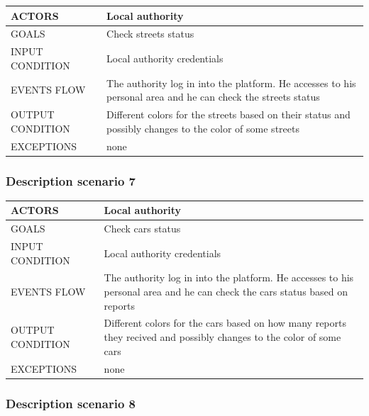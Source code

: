 \begin{center}
	\begin{tabular}{ | l | p{6cm} | } 
		\hline
		ACTORS & Local authority  \\ 
		\hline
		GOALS & Check streets status  \\ 
		\hline
		INPUT CONDITION & Local authority credentials  \\ 
		\hline
		EVENTS FLOW & The authority log in into the platform. He accesses to his personal area and he can check the streets status \\ 
		\hline
		OUTPUT CONDITION & Different colors for the streets based on their status and possibly changes to the color of some streets \\ 
		\hline
		EXCEPTIONS & none \\ 
		\hline
	\end{tabular}
\end{center}

\subsubsection{Description scenario 7}

\begin{center}
	\begin{tabular}{ | l | p{6cm} | } 
		\hline
		ACTORS & Local authority  \\ 
		\hline
		GOALS & Check cars status  \\ 
		\hline
		INPUT CONDITION & Local authority credentials  \\ 
		\hline
		EVENTS FLOW & The authority log in into the platform. He accesses to his personal area and he can check the cars status based on reports \\ 
		\hline
		OUTPUT CONDITION & Different colors for the cars based on how many reports they recived and possibly changes to the color of some cars \\ 
		\hline
		EXCEPTIONS & none \\ 
		\hline
	\end{tabular}
\end{center}

\subsubsection{Description scenario 8}

